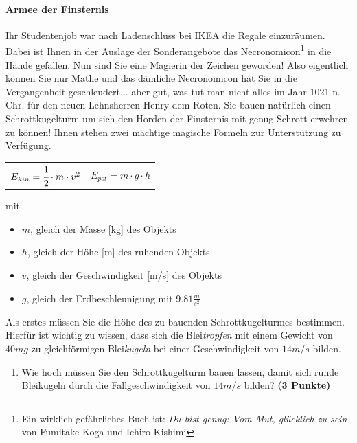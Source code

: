 \documentclass[a4paper, 9pt]{scrartcl}\usepackage[]{graphicx}\usepackage[]{xcolor}
\begin{document}
\paragraph{Armee der Finsternis}



Ihr Studentenjob war nach Ladenschluss bei IKEA die Regale
einzur{\"a}umen. Dabei ist Ihnen in der Auslage der Sonderangebote das
Necronomicon\footnote{Ein wirklich gef{\"a}hrliches Buch ist:
  \textit{Du bist genug: Vom Mut, gl{\"u}cklich zu sein} von Fumitake Koga und
  Ichiro Kishimi} in die H{\"a}nde gefallen. Nun sind Sie eine Magierin der
Zeichen geworden! Also eigentlich k{\"o}nnen Sie nur Mathe und das d{\"a}mliche
Necronomicon hat Sie in die Vergangenheit geschleudert... aber gut, was tut
man nicht alles im Jahr 1021 n. Chr. f{\"u}r den neuen Lehnsherren
Henry dem Roten. Sie bauen nat{\"u}rlich einen Schrottkugelturm um sich den
Horden der Finsternis mit genug Schrott erwehren zu k{\"o}nnen! Ihnen stehen
zwei m{\"a}chtige magische Formeln zur Unterst{\"u}tzung zu Verf{\"u}gung.

\begin{center}
  \begin{tabular}{cc}
    $E_{kin} = \cfrac{1}{2}\cdot m \cdot v^2$ & $E_{pot} = m \cdot g \cdot h$\\
  \end{tabular}
\end{center}

mit

\begin{itemize}
\item $m$, gleich der Masse [kg] des Objekts
\item $h$, gleich der H{\"o}he [m] des ruhenden Objekts
\item $v$, gleich der Geschwindigkeit [m/s] des Objekts
\item $g$, gleich der Erdbeschleunigung mit $9.81 \tfrac{m}{s^2}$ 
\end{itemize}

Als erstes m{\"u}ssen Sie die H{\"o}he des zu bauenden Schrottkugelturmes
bestimmen. Hierf{\"u}r ist wichtig zu wissen, dass sich die
Blei\textit{tropfen} mit einem Gewicht von $40mg$ zu
gleichf{\"o}rmigen Blei\textit{kugeln} bei einer Geschwindigkeit von
$14m/s$ bilden.

\begin{enumerate}
\item Wie hoch m{\"u}ssen Sie den Schrottkugelturm bauen lassen, damit sich
  runde Bleikugeln durch die Fallgeschwindigkeit von $14m/s$ bilden?
  \textbf{(3 Punkte)}
\end{enumerate}
\end{document}
